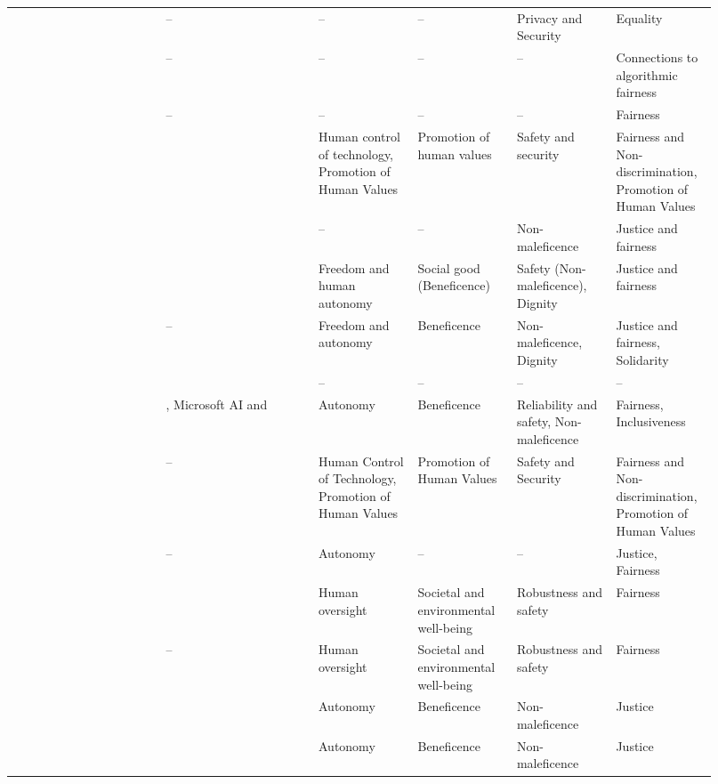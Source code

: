 \begin{landscape}
\begin{ThreePartTable}
\begin{longtable}{P{0.2\linewidth}P{0.2\linewidth}P{0.13\linewidth}P{0.13\linewidth}P{0.13\linewidth}P{0.13\linewidth}}
        \textcite{Gupta_2021} & -- & -- & -- & Privacy and Security & Equality \\ 
        \textcite{Hacker_2022} & -- & -- & -- & -- & Connections to \mbox{algorithmic} fairness \\ 
        \textcite{Hagendorff_2020} & -- & -- & -- & -- & Fairness \\ 
        \textcite{Havrda_2020} & \textcite{Fjeld_2020} & Human control of \mbox{technology}, \mbox{Promotion} of Human Values & Promotion of human values & Safety and security & Fairness and \mbox{Non-discrimination}, Promotion of Human Values \\ 
        \textcite{Henriksen_2021} & \textcite{Jobin_2019} & -- & -- & Non-maleficence & Justice and fairness \\ 
        \textcite{Jakesch_2022} & \textcite{Jobin_2019} & Freedom and human autonomy & Social good (\mbox{Beneficence})\tnote{*} & Safety (Non-maleficence)\tnote{*}, Dignity & Justice and fairness \\ 
        \textcite{Jobin_2019} & -- & Freedom and autonomy & Beneficence & Non-maleficence, \mbox{Dignity} & Justice and fairness, Solidarity \\ 
        \textcite{Kumar_2021} & \textcite{Dignum_2017} & -- & -- & -- & -- \\ 
        \textcite{Liu_2021} & \textcite{Clarke_2019}, Microsoft AI and \textcite{Floridi_2018} & Autonomy & Beneficence & Reliability and safety, Non-maleficence & Fairness, Inclusiveness \\ 
        \textcite{Lu_2022} & -- & Human Control of Technology, Promotion of Human Values & Promotion of Human Values & Safety and Security & Fairness and Non-discrimination, \mbox{Promotion} of Human Values \\ 
        \textcite{Lukkien_2021} & -- & Autonomy & -- & -- & Justice, Fairness \\ 
        \textcite{Merhi_2022} & \textcite{Mikalef_2022} & Human oversight & Societal and environmental well-being & Robustness and safety & Fairness \\ 
        \textcite{Mikalef_2022} & -- & Human oversight & Societal and environmental well-being & Robustness and safety & Fairness \\ 
        \textcite{Morley_2020} & \textcite{Floridi_2018} & Autonomy & Beneficence & Non-maleficence & Justice \\ 
        \textcite{Morley_2021} & \textcite{Floridi_2018} & Autonomy & Beneficence & Non-maleficence & Justice \\ 

\end{longtable}
\end{ThreePartTable}
\end{landscape}
